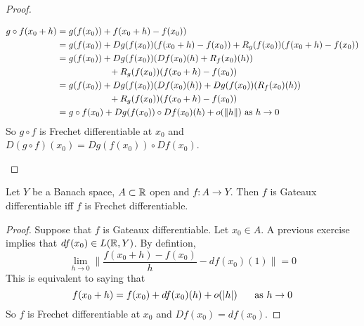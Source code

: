 \documentclass{book}
\begin{document}
\begin{proof}
\begin{itemize}
\begin{align*}
	g \circ f(x_0 + h) 
	&=  g (f(x_0)) + f(x_0 + h) - f(x_0)) \\
	&= g(f(x_0)) + Dg(f(x_0))(f(x_0 + h) - f(x_0)) + R_g(f(x_0))(f(x_0 + h) - f(x_0)) \\
	&= g(f(x_0)) + Dg(f(x_0))(Df(x_0)(h) + R_f(x_0)(h)) \\
	& \hspace{2.05cm} +  R_g(f(x_0))(f(x_0 + h) - f(x_0)) \\
	&= g(f(x_0)) + Dg(f(x_0))(Df(x_0)(h)) + Dg(f(x_0))(R_f(x_0)(h)) \\
	& \hspace{2.05cm} +  R_g(f(x_0))(f(x_0 + h) - f(x_0)) \\
	&= g \circ f(x_0) + Dg(f(x_0)) \circ Df(x_0)(h) + o(\|h\|) \text{ as } h \rightarrow 0
	\end{align*}
	So $g \circ f$ is Frechet differentiable at $x_0$ and $D(g \circ f)(x_0) = Dg(f(x_0)) \circ Df(x_0)$.
	\end{itemize}
	\end{proof}
	
	\begin{ex} 
	Let $Y$ be a Banach space, $A \subset \mathbb{R}$ open and $f:A \rightarrow Y$. Then $f$ is Gateaux differentiable iff $f$ is Frechet differentiable.
	\end{ex}
	
	\begin{proof}
	Suppose that $f$ is Gateaux differentiable. Let $x_0 \in A$. A previous exercise implies that $df(x_0) \in L(\mathbb{R}, Y)$. By defintion, $$  \lim_{h \rightarrow 0} \bigg \| \frac{f(x_0 + h) - f(x_0)}{h} - df(x_0)(1) \bigg \| = 0$$ 
	This is equivalent to saying that $$f(x_0 + h) = f(x_0) + df(x_0)(h) + o(|h|) \hspace{.5cm} \text{ as } h \rightarrow 0$$
	So $f$ is Frechet differentiable at $x_0$ and $Df(x_0) = df(x_0)$.
	\end{proof}
	
	
	
	
	
	
	
	
	\newpage
\end{document}
